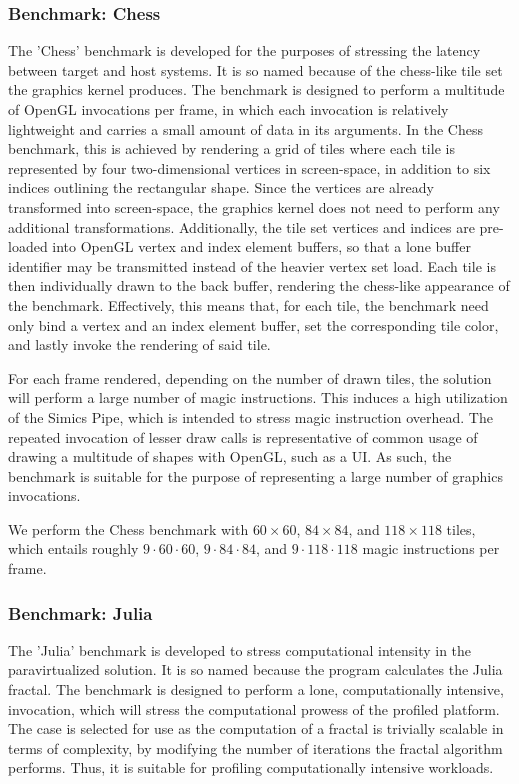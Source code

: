 \subsubsection{Benchmark: Chess}
\label{par:experimentalmethodology_benchmarking_benchmarkchess}
The 'Chess' benchmark is developed for the purposes of stressing the latency between target and host systems.
It is so named because of the chess-like tile set the graphics kernel produces.
The benchmark is designed to perform a multitude of OpenGL invocations per frame, in which each invocation is relatively lightweight and carries a small amount of data in its arguments.
In the Chess benchmark, this is achieved by rendering a grid of tiles where each tile is represented by four two-dimensional vertices in screen-space, in addition to six indices outlining the rectangular shape.
Since the vertices are already transformed into screen-space, the graphics kernel does not need to perform any additional transformations.
Additionally, the tile set vertices and indices are pre-loaded into OpenGL vertex and index element buffers, so that a lone buffer identifier may be transmitted instead of the heavier vertex set load.
Each tile is then individually drawn to the back buffer, rendering the chess-like appearance of the benchmark.
Effectively, this means that, for each tile, the benchmark need only bind a vertex and an index element buffer, set the corresponding tile color, and lastly invoke the rendering of said tile.

For each frame rendered, depending on the number of drawn tiles, the solution will perform a large number of magic instructions.
This induces a high utilization of the Simics Pipe, which is intended to stress magic instruction overhead.
The repeated invocation of lesser draw calls is representative of common usage of drawing a multitude of shapes with OpenGL, such as a UI.
As such, the benchmark is suitable for the purpose of representing a large number of graphics invocations.

We perform the Chess benchmark with $60\times60$, $84\times84$, and $118\times118$ tiles, which entails roughly $9\cdot60\cdot60$, $9\cdot84\cdot84$, and $9\cdot118\cdot118$ magic instructions per frame.

\subsubsection{Benchmark: Julia}
\label{par:experimentalmethodology_benchmarking_benchmarkjulia}
The 'Julia' benchmark is developed to stress computational intensity in the paravirtualized solution.
It is so named because the program calculates the Julia fractal.
The benchmark is designed to perform a lone, computationally intensive, invocation, which will stress the computational prowess of the profiled platform.
The case is selected for use as the computation of a fractal is trivially scalable in terms of complexity, by modifying the number of iterations the fractal algorithm performs.
Thus, it is suitable for profiling computationally intensive workloads.

